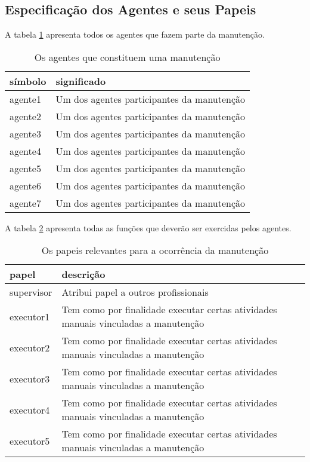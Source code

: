 \subsection{Especificação dos Agentes e seus Papeis}

A tabela \ref{agents} apresenta todos os agentes que fazem parte da manutenção. 
\begin{table}[H]
\centering
\begin{tabular}{|l|l|}
\hline
\textbf{símbolo} & \textbf{significado} \\ \hline
agente1 & Um dos agentes participantes da manutenção \\ \hline
agente2 & Um dos agentes participantes da manutenção \\ \hline
agente3 & Um dos agentes participantes da manutenção \\ \hline
agente4 & Um dos agentes participantes da manutenção \\ \hline
agente5 & Um dos agentes participantes da manutenção \\ \hline
agente6 & Um dos agentes participantes da manutenção \\ \hline
agente7 & Um dos agentes participantes da manutenção \\ \hline
\end{tabular}
\caption{Os agentes que constituem uma manutenção}
\label{agents}
\end{table}

 A tabela \ref{roles} apresenta todas as funções que deverão ser exercidas pelos agentes.

\begin{table}[H]
\centering
\begin{tabular}{|l|l|}
\hline
\textbf{papel} & \textbf{descrição} \\ \hline
supervisor & Atribui papel a outros profissionais \\ \hline
executor1 & Tem como por finalidade executar certas atividades manuais vinculadas a manutenção \\ \hline
executor2 & Tem como por finalidade executar certas atividades manuais vinculadas a manutenção \\ \hline
executor3 & Tem como por finalidade executar certas atividades manuais vinculadas a manutenção \\ \hline
executor4 & Tem como por finalidade executar certas atividades manuais vinculadas a manutenção \\ \hline
executor5 & Tem como por finalidade executar certas atividades manuais vinculadas a manutenção \\ \hline
\end{tabular}
\caption{Os papeis relevantes para a ocorrência da manutenção}
\label{roles}
\end{table}

